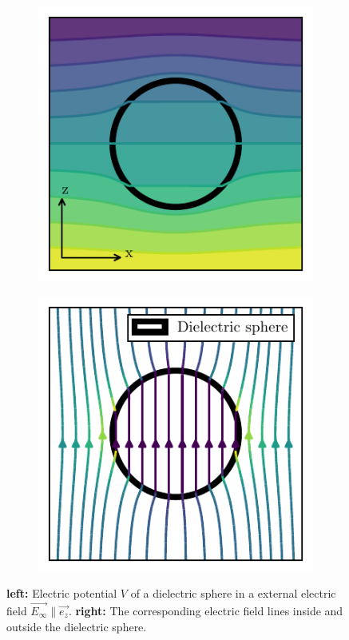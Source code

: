 \begin{figure}[!htbp]
  \centering
  \begin{subfigure}[b]{0.48\textwidth}
      \centering
      \includegraphics[width=\textwidth]{./../figures/potential-dielectric-sphere-small.pdf}
  \end{subfigure}
  \hfill
  \begin{subfigure}[b]{0.48\textwidth}
      \centering
      \includegraphics[width=\textwidth]{./../figures/others/field-dielectric-sphere-small.pdf}
  \end{subfigure}
  \caption{\textbf{left:} Electric potential $V$ of a dielectric sphere in a external electric field $\vec{E_\infty} \parallel \vec{e_z}$. \textbf{right:} The corresponding electric field lines inside and outside the dielectric sphere.}
  \label{fig:dielectric-sphere-field}
\end{figure}